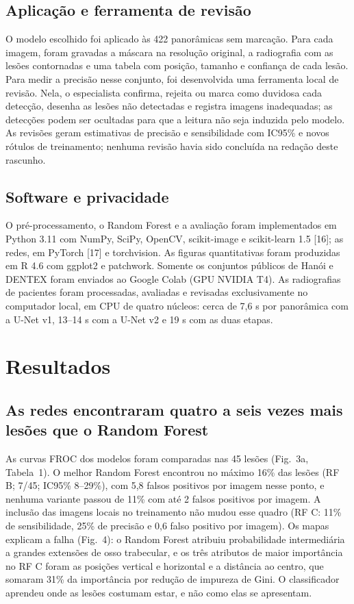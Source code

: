 \documentclass[twocolumn]{article}
\begin{document}
\subsection{Aplicação e ferramenta de revisão}

O modelo escolhido foi aplicado às 422 panorâmicas sem marcação. Para cada imagem, foram gravadas a máscara na resolução original, a radiografia com as lesões contornadas e uma tabela com posição, tamanho e confiança de cada lesão. Para medir a precisão nesse conjunto, foi desenvolvida uma ferramenta local de revisão. Nela, o especialista confirma, rejeita ou marca como duvidosa cada detecção, desenha as lesões não detectadas e registra imagens inadequadas; as detecções podem ser ocultadas para que a leitura não seja induzida pelo modelo. As revisões geram estimativas de precisão e sensibilidade com IC95\% e novos rótulos de treinamento; nenhuma revisão havia sido concluída na redação deste rascunho.

\subsection{Software e privacidade}

O pré-processamento, o Random Forest e a avaliação foram implementados em Python 3.11 com NumPy, SciPy, OpenCV, scikit-image e scikit-learn 1.5 [16]; as redes, em PyTorch [17] e torchvision. As figuras quantitativas foram produzidas em R 4.6 com ggplot2 e patchwork. Somente os conjuntos públicos de Hanói e DENTEX foram enviados ao Google Colab (GPU NVIDIA T4). As radiografias de pacientes foram processadas, avaliadas e revisadas exclusivamente no computador local, em CPU de quatro núcleos: cerca de 7,6 s por panorâmica com a U-Net v1, 13--14 s com a U-Net v2 e 19 s com as duas etapas.

\section{Resultados}

\subsection{As redes encontraram quatro a seis vezes mais lesões que o Random Forest}

As curvas FROC dos modelos foram comparadas nas 45 lesões (Fig.~3a, Tabela~1). O melhor Random Forest encontrou no máximo 16\% das lesões (RF B; 7/45; IC95\% 8--29\%), com 5,8 falsos positivos por imagem nesse ponto, e nenhuma variante passou de 11\% com até 2 falsos positivos por imagem. A inclusão das imagens locais no treinamento não mudou esse quadro (RF C: 11\% de sensibilidade, 25\% de precisão e 0,6 falso positivo por imagem). Os mapas explicam a falha (Fig.~4): o Random Forest atribuiu probabilidade intermediária a grandes extensões de osso trabecular, e os três atributos de maior importância no RF C foram as posições vertical e horizontal e a distância ao centro, que somaram 31\% da importância por redução de impureza de Gini. O classificador aprendeu onde as lesões costumam estar, e não como elas se apresentam.
\end{document}
